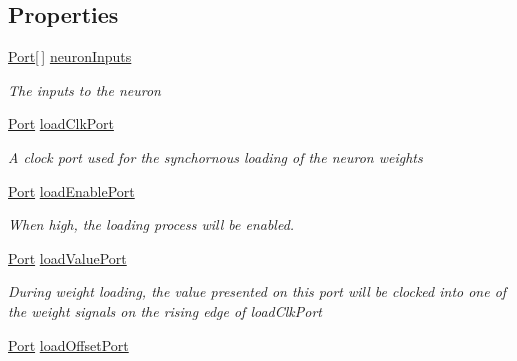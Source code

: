 \subsection*{Properties}
\begin{DoxyCompactItemize}
\item 
\hyperlink{class_n_n_gen_1_1_port}{Port}\mbox{[}$\,$\mbox{]} \hyperlink{class_n_n_gen_1_1_async_neuron_ae248edac3250fffe3fdba7ff2dd8288b}{neuron\+Inputs}
\begin{DoxyCompactList}\small\item\em The inputs to the neuron \end{DoxyCompactList}\item 
\hyperlink{class_n_n_gen_1_1_port}{Port} \hyperlink{class_n_n_gen_1_1_async_neuron_a374b98dccdbd95b77e6e64d896220a8b}{load\+Clk\+Port}
\begin{DoxyCompactList}\small\item\em A clock port used for the synchornous loading of the neuron weights \end{DoxyCompactList}\item 
\hyperlink{class_n_n_gen_1_1_port}{Port} \hyperlink{class_n_n_gen_1_1_async_neuron_a83a3e6466b062e49a29ce46508e2bdf0}{load\+Enable\+Port}
\begin{DoxyCompactList}\small\item\em When high, the loading process will be enabled. \end{DoxyCompactList}\item 
\hyperlink{class_n_n_gen_1_1_port}{Port} \hyperlink{class_n_n_gen_1_1_async_neuron_a765bcf8344758b0e967117390749882d}{load\+Value\+Port}
\begin{DoxyCompactList}\small\item\em During weight loading, the value presented on this port will be clocked into one of the weight signals on the rising edge of load\+Clk\+Port \end{DoxyCompactList}\item 
\hyperlink{class_n_n_gen_1_1_port}{Port} \hyperlink{class_n_n_gen_1_1_async_neuron_a96074bc794e643df031319b43efb986c}{load\+Offset\+Port}

\end{DoxyCompactItemize}
